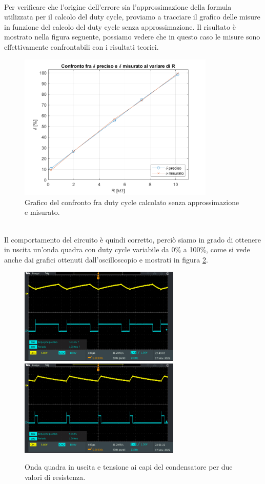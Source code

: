 \documentclass{report}
\begin{document}
\\Per verificare che l'origine dell'errore sia l'approssimazione della formula utilizzata per il calcolo del duty cycle, proviamo a tracciare il grafico delle misure in funzione del calcolo del duty cycle senza approssimazione. Il risultato è mostrato nella figura seguente, possiamo vedere che in questo caso le misure sono effettivamente confrontabili con i risultati teorici.
\begin{figure}[h!]
	\centering
	\includegraphics[height=7cm]{immagini/graficomis4_prec}
	\caption{Grafico del confronto fra duty cycle calcolato senza approssimazione e misurato.}
	\label{figura:grafico4_prec}
\end{figure}
\\Il comportamento del circuito è quindi corretto, perciò siamo in grado di ottenere in uscita un'onda quadra con duty cycle variabile da 0\% a 100\%, come si vede anche dai grafici ottenuti dall'oscilloscopio e mostrati in figura \ref{figura:TEK00032e36}.
\begin{figure}[h!]
	\centering
	\includegraphics[height=4.6cm]{immagini/TEK00032}
	\includegraphics[height=4.6cm]{immagini/TEK00036}
	\caption{Onda quadra in uscita e tensione ai capi del condensatore per due valori di resistenza.}
	\label{figura:TEK00032e36}
\end{figure}

\end{document}
